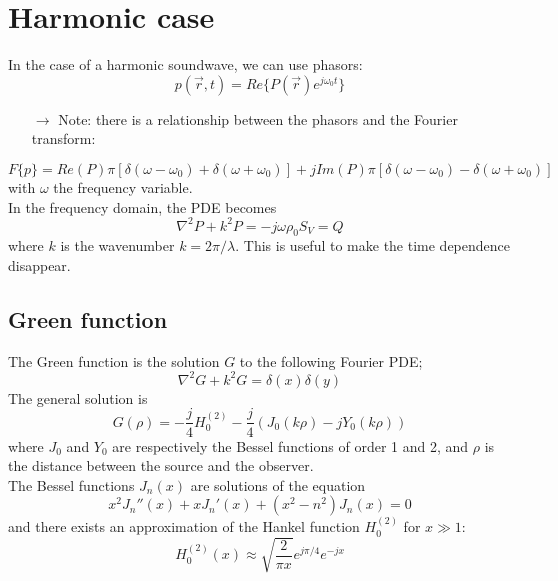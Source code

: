 \documentclass[12pt, openany]{report}
\theoremstyle{definition}
\begin{document}
\section{Harmonic case}
In the case of a harmonic soundwave, we can use phasors:
\begin{equation}
  p(\vec r, t)=Re\{P(\vec r)e^{j\omega_0t}\}
\end{equation}
\begin{itemize}
  \item [$\to$] Note: there is a relationship between the phasors and the Fourier transform:
\end{itemize}
\begin{equation}
  F\{p\} = Re(P)\pi[\delta (\omega-\omega_0) + \delta (\omega+\omega_0)] + jIm(P)\pi[\delta (\omega-\omega_0) - \delta (\omega+\omega_0)]
\end{equation}
with $\omega$ the frequency variable.\\
In the frequency domain, the PDE becomes
\begin{equation}\label{eq:wave}
  \nabla^2 P+k^2 P= -j\omega \rho_0 S_V = Q 
\end{equation}
where $k$ is the wavenumber $k=2\pi/\lambda$. This is useful to make the time dependence disappear. 
\subsection{Green function}
The Green function is the solution $G$ to the following Fourier PDE;
\begin{equation}
  \nabla^2 G+k^2G = \delta(x)\delta (y)
\end{equation}
The general solution is 
\begin{equation}
  G(\rho) = -\frac{j}{4}H_0^{(2)} -\frac{j}{4}(J_0(k\rho) - jY_0(k\rho))
\end{equation}
where $J_0$ and $Y_0$ are respectively the Bessel functions of order 1 and 2, and $\rho$ is the distance between the source and the observer.\\
The Bessel functions $J_n(x)$ are solutions of the equation
\begin{equation}
  x^2J_n''(x)+xJ_n'(x) + (x^2-n^2) J_n(x)=0
\end{equation}
and there exists an approximation of the Hankel function $H_0^{(2)}$ for $x\gg 1$:
\begin{equation}
  H_0^{(2)}(x) \approx \sqrt{\frac{2}{\pi x}} e^{j\pi/4}e^{-jx}
\end{equation}
\end{document}
